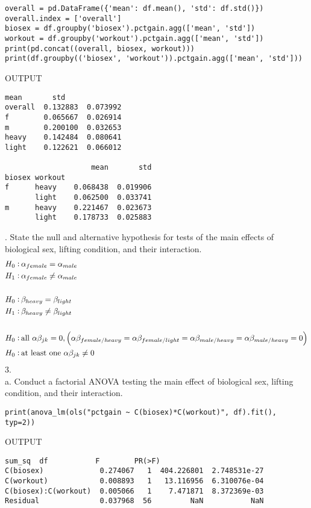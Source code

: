 \documentclass[onecolumn,10pt]{jhwhw}
\begin{document}
\begin{lstlisting}
overall = pd.DataFrame({'mean': df.mean(), 'std': df.std()})
overall.index = ['overall']
biosex = df.groupby('biosex').pctgain.agg(['mean', 'std'])
workout = df.groupby('workout').pctgain.agg(['mean', 'std'])
print(pd.concat((overall, biosex, workout)))
print(df.groupby(('biosex', 'workout')).pctgain.agg(['mean', 'std']))
\end{lstlisting}
\noindent OUTPUT
\begin{lstlisting}[language={}]
             mean       std
overall  0.132883  0.073992
f        0.065667  0.026914
m        0.200100  0.032653
heavy    0.142484  0.080641
light    0.122621  0.066012

                    mean       std
biosex workout
f      heavy    0.068438  0.019906
       light    0.062500  0.033741
m      heavy    0.221467  0.023673
       light    0.178733  0.025883
\end{lstlisting}
\vspace{1em}
. State the null and alternative hypothesis for tests of the main effects of biological sex, lifting condition, and their interaction.
\begin{align*}
H_0: \hspace{0.2em} &\alpha_{female} = \alpha_{male} \\
H_1: \hspace{0.2em} &\alpha_{female} \neq \alpha_{male}\\
\hspace{0.2em} &\\
H_0: \hspace{0.2em} &\beta_{heavy} = \beta_{light} \\
H_1: \hspace{0.2em} &\beta_{heavy} \neq \beta_{light}\\
\hspace{0.2em} &\\
H_0: \hspace{0.2em} &\mbox{all } \alpha \beta_{jk} = 0, \left(\alpha \beta_{female/heavy} = \alpha \beta_{female/light} = \alpha \beta_{male/heavy} = \alpha \beta_{male/heavy} =0\right)\\
H_0: \hspace{0.2em} &\mbox{at least one } \alpha \beta_{jk} \neq 0
\end{align*}
3.\\
a. Conduct a factorial ANOVA testing the main effect of biological sex, lifting condition, and their interaction.
\begin{lstlisting}
print(anova_lm(ols("pctgain ~ C(biosex)*C(workout)", df).fit(), typ=2))
\end{lstlisting}
\noindent OUTPUT
\begin{lstlisting}[language={}]
                        sum_sq  df           F        PR(>F)
C(biosex)             0.274067   1  404.226801  2.748531e-27
C(workout)            0.008893   1   13.116956  6.310076e-04
C(biosex):C(workout)  0.005066   1    7.471871  8.372369e-03
Residual              0.037968  56         NaN           NaN
\end{lstlisting}
\end{document}
